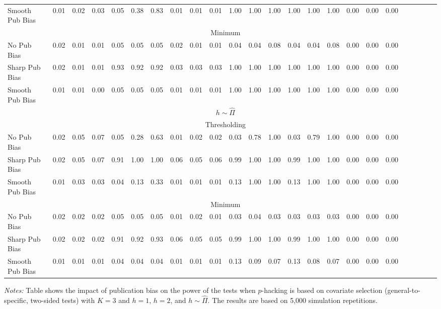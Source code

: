 \begin{table}[H]
\begin{center}
\begin{tabular}{lccccccccccccccccccccccc}
Smooth Pub Bias & 0.01 & 0.02 & 0.03 & 0.05 & 0.38 & 0.83 & 0.01 & 0.01 & 0.01 & 1.00 & 1.00 & 1.00 & 1.00 & 1.00 & 1.00 & 0.00 & 0.00 & 0.00 \\
\textit{} & \multicolumn{18}{c}{Minimum} \\ \cline{2-19}
No Pub Bias & 0.02 & 0.01 & 0.01 & 0.05 & 0.05 & 0.05 & 0.02 & 0.01 & 0.01 & 0.04 & 0.04 & 0.08 & 0.04 & 0.04 & 0.08 & 0.00 & 0.00 & 0.00 \\
Sharp Pub Bias & 0.02 & 0.01 & 0.01 & 0.93 & 0.92 & 0.92 & 0.03 & 0.03 & 0.03 & 1.00 & 1.00 & 1.00 & 1.00 & 1.00 & 1.00 & 0.00 & 0.00 & 0.00 \\
Smooth Pub Bias & 0.01 & 0.01 & 0.00 & 0.05 & 0.05 & 0.05 & 0.01 & 0.01 & 0.01 & 1.00 & 1.00 & 1.00 & 1.00 & 1.00 & 1.00 & 0.00 & 0.00 & 0.00 \\
\hline
\multicolumn{1}{c}{} & \multicolumn{18}{c}{$h\sim\widehat{\Pi}$} \\
\textit{} & \multicolumn{18}{c}{Thresholding} \\ \cline{2-19}
No Pub Bias & 0.02 & 0.05 & 0.07 & 0.05 & 0.28 & 0.63 & 0.01 & 0.02 & 0.02 & 0.03 & 0.78 & 1.00 & 0.03 & 0.79 & 1.00 & 0.00 & 0.00 & 0.00 \\
Sharp Pub Bias & 0.02 & 0.05 & 0.07 & 0.91 & 1.00 & 1.00 & 0.06 & 0.05 & 0.06 & 0.99 & 1.00 & 1.00 & 0.99 & 1.00 & 1.00 & 0.00 & 0.00 & 0.00 \\
Smooth Pub Bias & 0.01 & 0.03 & 0.03 & 0.04 & 0.13 & 0.33 & 0.01 & 0.01 & 0.01 & 0.13 & 1.00 & 1.00 & 0.13 & 1.00 & 1.00 & 0.00 & 0.00 & 0.00 \\
\textit{} & \multicolumn{18}{c}{Minimum} \\ \cline{2-19}
No Pub Bias & 0.02 & 0.02 & 0.02 & 0.05 & 0.05 & 0.05 & 0.01 & 0.02 & 0.01 & 0.03 & 0.04 & 0.03 & 0.03 & 0.03 & 0.03 & 0.00 & 0.00 & 0.00 \\
Sharp Pub Bias & 0.02 & 0.02 & 0.02 & 0.91 & 0.92 & 0.93 & 0.06 & 0.05 & 0.05 & 0.99 & 1.00 & 1.00 & 0.99 & 1.00 & 1.00 & 0.00 & 0.00 & 0.00 \\
Smooth Pub Bias & 0.01 & 0.01 & 0.01 & 0.04 & 0.04 & 0.04 & 0.01 & 0.01 & 0.01 & 0.13 & 0.09 & 0.07 & 0.13 & 0.08 & 0.07 & 0.00 & 0.00 & 0.00 \\
\bottomrule
\end{tabular}
\end{center}
\footnotesize{\textit{Notes:} Table shows the impact of publication bias on the power of the tests when $p$-hacking is based on covariate selection (general-to-specific, two-sided tests) with $K=3$ and $h=1$, $h=2$, and $h\sim \widehat{\Pi}$. The results are based on 5,000 simulation repetitions.}
\end{table}
